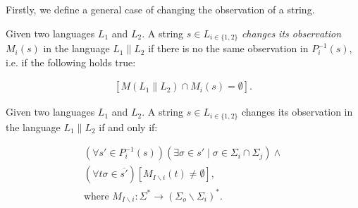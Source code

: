 \documentclass[a4paper, 10pt, conference]{ieeeconf} \IEEEoverridecommandlockouts
\begin{document}
Firstly, we define a general case of changing the observation of a string.
\begin{definition}Given two languages $L_1$ and $L_2$. A string $s \in L_{i \in
\{1,2\}}$ \emph{changes its observation} $M_i(s)$ in the language $L_1 \parallel
L_2$ if there is no the same observation in $P_i^{-1}(s)$, i.e.
if the following holds true:
\end{definition}
\begin{equation}
\begin{array}{l}
	\left[ M(L_1 \parallel L_2) \cap M_i(s) = \emptyset \right].
\end{array}
\end{equation}

\begin{lemma}
\label{lem_changed_observation}
Given two languages $L_1$ and $L_2$. A string $s \in L_{i \in \{1,2\}}$ changes
its observation in the language $L_1 \parallel L_2$ if and only if:
\end{lemma}
\begin{equation}
\begin{array}{l}
	(\forall s' \in P_i^{-1}(s))
	(\exists \sigma \in s' \mid \sigma \in \Sigma_i \cap \Sigma_j) \land
	\\
	(\forall t\sigma \in \overline{s'})
	\left[M_{I\backslash i}(t) \neq \emptyset \right],
	\\
	\textrm{where } M_{I\backslash i}: \Sigma^* \rightarrow (\Sigma_{o} \backslash
	\Sigma_i)^*.
\end{array}
\end{equation}
\end{document}

